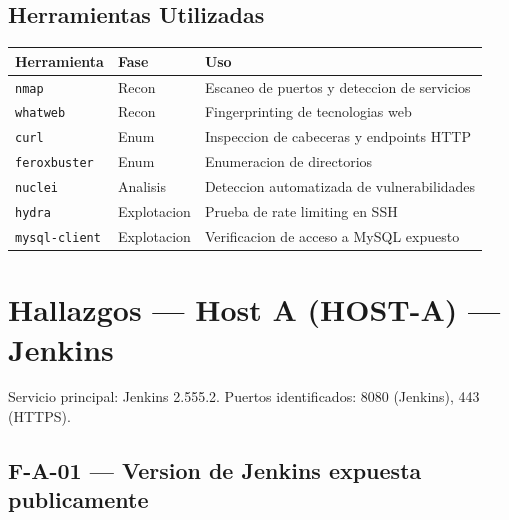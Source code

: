 \documentclass[11pt,a4paper]{article}
\begin{document}
\subsection{Herramientas Utilizadas}

\begin{center}
\begin{tabular}{llp{7cm}}
\toprule
\textbf{Herramienta} & \textbf{Fase} & \textbf{Uso} \\
\midrule
\texttt{nmap}         & Recon       & Escaneo de puertos y deteccion de servicios \\
\texttt{whatweb}      & Recon       & Fingerprinting de tecnologias web \\
\texttt{curl}         & Enum        & Inspeccion de cabeceras y endpoints HTTP \\
\texttt{feroxbuster}  & Enum        & Enumeracion de directorios \\
\texttt{nuclei}       & Analisis    & Deteccion automatizada de vulnerabilidades \\
\texttt{hydra}        & Explotacion & Prueba de rate limiting en SSH \\
\texttt{mysql-client} & Explotacion & Verificacion de acceso a MySQL expuesto \\
\bottomrule
\end{tabular}
\end{center}

\newpage

\section{Hallazgos --- Host A (HOST-A) --- Jenkins}

Servicio principal: Jenkins 2.555.2.
Puertos identificados: 8080 (Jenkins), 443 (HTTPS).

\vspace{0.3cm}

\subsection{F-A-01 --- Version de Jenkins expuesta publicamente}
\end{document}
